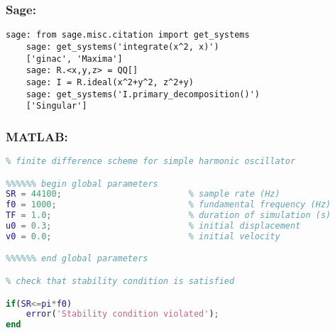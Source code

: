 \subsubsection*{Sage:}

\begin{lstlisting}[language=Sage, style = SageStyle]
    sage: from sage.misc.citation import get_systems
    sage: get_systems('integrate(x^2, x)')
    ['ginac', 'Maxima']
    sage: R.<x,y,z> = QQ[]
    sage: I = R.ideal(x^2+y^2, z^2+y)
    sage: get_systems('I.primary_decomposition()')
    ['Singular']
\end{lstlisting}


\subsubsection*{MATLAB:}


\begin{lstlisting}[language=Matlab, style = MatlabStyle]
% matlab script sho.m
% finite difference scheme for simple harmonic oscillator

%%%%%% begin global parameters
SR = 44100;                         % sample rate (Hz)
f0 = 1000;                          % fundamental frequency (Hz)
TF = 1.0;                           % duration of simulation (s)
u0 = 0.3;                           % initial displacement
v0 = 0.0;                           % initial velocity

%%%%%% end global parameters

% check that stability condition is satisfied

if(SR<=pi*f0)
    error('Stability condition violated');
end
\end{lstlisting}


\clearpage